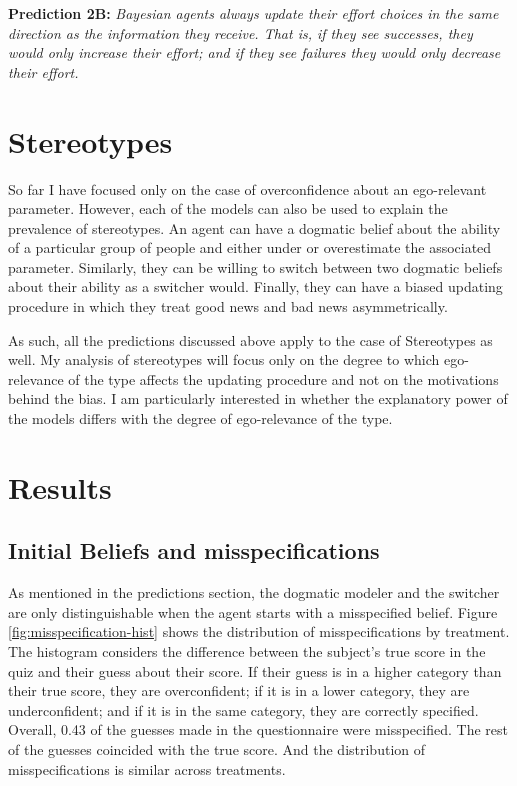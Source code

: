\documentclass[
  12pt,
]{article}
\begin{document}
\textbf{Prediction 2B:} \emph{Bayesian agents always update their effort
choices in the same direction as the information they receive. That is,
if they see successes, they would only increase their effort; and if
they see failures they would only decrease their effort.}

\hypertarget{stereotypes}{%
\section{Stereotypes}\label{stereotypes}}

So far I have focused only on the case of overconfidence about an
ego-relevant parameter. However, each of the models can also be used to
explain the prevalence of stereotypes. An agent can have a dogmatic
belief about the ability of a particular group of people and either
under or overestimate the associated parameter. Similarly, they can be
willing to switch between two dogmatic beliefs about their ability as a
switcher would. Finally, they can have a biased updating procedure in
which they treat good news and bad news asymmetrically.

As such, all the predictions discussed above apply to the case of
Stereotypes as well. My analysis of stereotypes will focus only on the
degree to which ego-relevance of the type affects the updating procedure
and not on the motivations behind the bias. I am particularly interested
in whether the explanatory power of the models differs with the degree
of ego-relevance of the type.

\hypertarget{results}{%
\section{Results}\label{results}}

\hypertarget{initial-beliefs-and-misspecifications}{%
\subsection{Initial Beliefs and
misspecifications}\label{initial-beliefs-and-misspecifications}}

As mentioned in the predictions section, the dogmatic modeler and the
switcher are only distinguishable when the agent starts with a
misspecified belief. Figure \ref{fig:misspecification-hist} shows the
distribution of misspecifications by treatment. The histogram considers
the difference between the subject's true score in the quiz and their
guess about their score. If their guess is in a higher category than
their true score, they are overconfident; if it is in a lower category,
they are underconfident; and if it is in the same category, they are
correctly specified. Overall, 0.43 of the guesses made in the
questionnaire were misspecified. The rest of the guesses coincided with
the true score. And the distribution of misspecifications is similar
across treatments.
\end{document}

